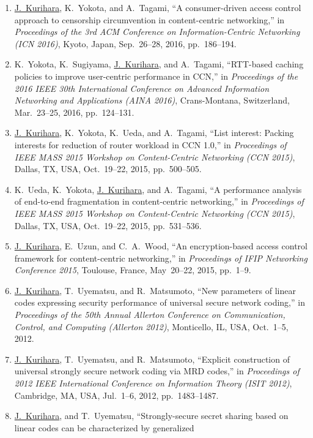 \begin{enumerate}
 \item \underline{J.~Kurihara}, K.~Yokota, and A.~Tagami, ``A consumer-driven access control approach to censorship circumvention in content-centric networking,'' in \textit{Proceedings of the 3rd ACM Conference on Information-Centric Networking (ICN 2016)}, Kyoto, Japan, Sep.~26--28, 2016, pp.~186--194.
 \item K.~Yokota, K.~Sugiyama, \underline{J.~Kurihara}, and A.~Tagami, ``RTT-based caching policies to improve user-centric performance in CCN,'' in \textit{Proceedings of the 2016 IEEE 30th International Conference on Advanced Information Networking and Applications (AINA 2016)}, Crans-Montana, Switzerland, Mar.~23--25, 2016, pp.~124--131.
 \item \underline{J.~Kurihara}, K.~Yokota, K.~Ueda, and A.~Tagami, ``List interest: Packing interests for reduction of router workload in CCN 1.0,'' in \textit{Proceedings of IEEE MASS 2015 Workshop on Content-Centric Networking (CCN 2015)}, Dallas, TX, USA, Oct.~19--22, 2015, pp.~500--505.
 \item K.~Ueda, K.~Yokota, \underline{J.~Kurihara}, and A.~Tagami, ``A performance analysis of end-to-end fragmentation in content-centric networking,'' in \textit{Proceedings of IEEE MASS 2015 Workshop on Content-Centric Networking (CCN 2015)}, Dallas, TX, USA, Oct.~19--22, 2015, pp.~531--536.
 \item \underline{J.~Kurihara}, E.~Uzun, and C.~A.~Wood, ``An encryption-based access control framework for content-centric networking,'' in \textit{Proceedings of IFIP Networking Conference 2015}, Toulouse, France, May~20--22, 2015, pp.~1--9.
 \item \underline{J.~Kurihara}, T.~Uyematsu, and R.~Matsumoto, ``New
       parameters of linear codes expressing security performance of
       universal secure network coding,''
       in \textit{Proceedings of the 50th Annual Allerton
       Conference on Communication, Control, and Computing (Allerton
       2012)}, Monticello, IL, USA, Oct.~1--5, 2012.
 \item \underline{J.~Kurihara}, T.~Uyematsu, and R.~Matsumoto,
       ``Explicit construction of universal strongly secure network
       coding via MRD codes,''
       in \textit{Proceedings of 2012 IEEE International Conference on
       Information Theory (ISIT 2012)}, Cambridge, MA, USA, Jul.~1--6,
       2012, pp.~1483--1487.
 \item \underline{J.~Kurihara}, and T.~Uyematsu, ``Strongly-secure secret
       sharing based on linear codes can be characterized by generalized

\end{enumerate}
